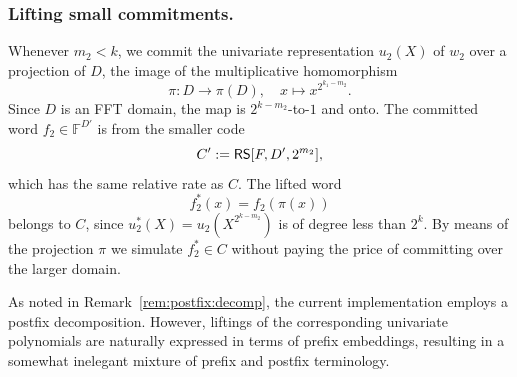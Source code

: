 \subsubsection{Lifting small commitments.}
Whenever $m_2 < k$, we commit the univariate representation $u_{2}(X)$ of $w_2$ over a projection of $D$, the image of the multiplicative homomorphism
\begin{equation}
\label{e:projection}
\pi: D \longrightarrow \pi(D),\quad x\mapsto x^{2^{k_1 - m_2}}.
\end{equation}
Since $D$ is an FFT domain, the map is $2^{k - m_2}$-to-$1$ and onto.
The committed word $f_2 \in \mathbb F^{D'}$ is from the smaller code
\begin{equation}
\label{e:projected:code}
C' := \mathsf{RS}[F, D', 2^{m_2}],
\end{equation}
which has the same relative rate as $C$.
The lifted word
\begin{equation}
\label{e:lifting:uni}
f_2^*(x) =  f_2(\pi(x)) %
\end{equation}
belongs to $C$, since $u_2^*(X) = u_2(X^{2^{k-m_2}})$ is of degree less than $2^{k}$.
%
By means of the projection $\pi$ we simulate $f_2^*\in C$ without paying the price of committing over the larger domain.


\begin{rem}
As noted in Remark~\ref{rem:postfix:decomp}, the current implementation employs a postfix decomposition. However, liftings of the corresponding univariate polynomials are naturally expressed in terms of prefix embeddings, resulting in a somewhat inelegant mixture of prefix and postfix terminology.
\end{rem}


